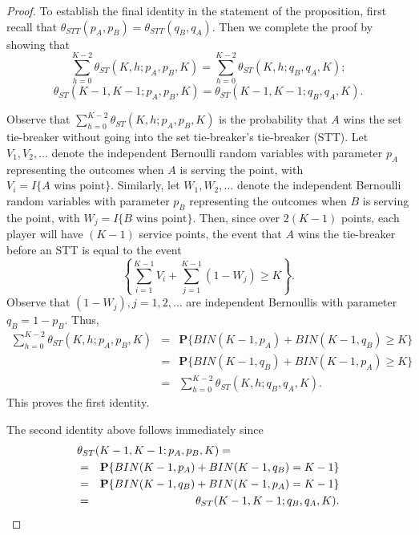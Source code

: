 \documentclass[11pt]{article}
\theoremstyle{plain}
\theoremstyle{definition}
\renewcommand{\Pr}{\mathbf{P}}
\newcommand{\RED}[1]{{\color{red} #1}}
\newcommand{\BLUE}[1]{{\color{blue} #1}}
\begin{document}
\begin{proof}
{\RED{To establish the final identity in the statement of the proposition, first recall that $\theta_{STT}(p_A,p_B) = \theta_{STT}(q_B,q_A)$. Then we complete the proof by showing that
%
$$\sum_{h=0}^{K-2} \theta_{ST}(K,h;p_A,p_B,K) = \sum_{h=0}^{K-2} \theta_{ST}(K,h;q_B,q_A,K);$$
$$\theta_{ST}(K-1,K-1;p_A,p_B,K) = \theta_{ST}(K-1,K-1;q_B,q_A,K).$$

\BLUE{
Observe that $\sum_{h=0}^{K-2} \theta_{ST}(K,h;p_A,p_B,K)$ is the probability that $A$ wins the set tie-breaker without going into the set tie-breaker's tie-breaker (STT). Let $V_1, V_2, \ldots$ denote the independent Bernoulli random variables with parameter $p_A$ representing the outcomes when $A$ is serving the point, with $V_i = I\{\mbox{$A$ wins point}\}$. Similarly, let $W_1, W_2, \ldots$ denote the independent Bernoulli random variables with parameter $p_B$ representing the outcomes when $B$ is serving the point, with $W_j = I\{\mbox{$B$ wins point}\}$. Then, since over $2(K-1)$ points, each player will have $(K-1)$ service points, the event that $A$ wins the tie-breaker before an STT is equal to the event
%
$$\left\{ \sum_{i=1}^{K-1} V_i + \sum_{j=1}^{K-1} (1-W_j) \ge K\right\}.$$
%
Observe that $(1-W_j), j=1,2,\ldots$ are independent Bernoullis with parameter $q_B = 1 - p_B$. Thus,
%
\begin{eqnarray*}
\sum_{h=0}^{K-2} \theta_{ST}(K,h;p_A,p_B,K) & = &
\Pr\{BIN(K-1,p_A) + BIN(K-1,q_B) \ge K\} \\
& = & \Pr\{BIN(K-1,q_B) + BIN(K-1,p_A) \ge K\} \\
& = &\sum_{h=0}^{K-2} \theta_{ST}(K,h;q_B,q_A,K).
\end{eqnarray*}
%
This proves the first identity.

The second identity above follows immediately since
\begin{eqnarray*}
\lefteqn{ \theta_{ST}(K-1,K-1;p_A,p_B,K)  = } \\
& = &\Pr\{BIN(K-1,p_A) + BIN(K-1,q_B) =  K-1\} \\
& = & \Pr\{BIN(K-1,q_B) + BIN(K-1,p_A) = K-1\} \\
& = & \theta_{ST}(K-1,K-1;q_B,q_A,K).
\end{eqnarray*}
}}


}
\end{proof}
\end{document}
